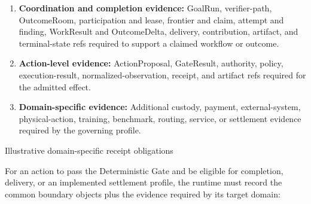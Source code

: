 \documentclass[
  11pt,
]{article}
\providecommand{\tightlist}{%
  \setlength{\itemsep}{0pt}\setlength{\parskip}{0pt}}
\begin{document}
\begin{enumerate}
\def\labelenumi{\arabic{enumi}.}
\tightlist
\item
  \textbf{Coordination and completion evidence:} GoalRun, verifier-path,
  OutcomeRoom, participation and lease, frontier and claim, attempt and
  finding, WorkResult and OutcomeDelta, delivery, contribution, artifact, and
  terminal-state refs required to support a claimed workflow or outcome.
\item
  \textbf{Action-level evidence:} ActionProposal, GateResult, authority,
  policy, execution-result, normalized-observation, receipt, and artifact
  refs required for the admitted effect.
\item
  \textbf{Domain-specific evidence:} Additional custody, payment,
  external-system, physical-action, training, benchmark, routing, service,
  or settlement evidence required by the governing profile.
\end{enumerate}

Illustrative domain-specific receipt obligations

For an action to pass the Deterministic Gate and be eligible for
completion, delivery, or an implemented settlement profile, the runtime must
record the common boundary objects plus the evidence required by its target
domain:
\end{document}
